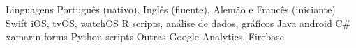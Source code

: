\begin{cvskills}
  \cvskill
    {Linguagens}
    {Português (nativo), Inglês (fluente), Alemão e Francês (iniciante)}
  \cvskill
    {Swift}
    {iOS, tvOS, watchOS}
    \cvskill
    {R}
    {scripts, análise de dados, gráficos}
  \cvskill
    {Java}
    {android}
  \cvskill
    {C\#}
    {xamarin-forms}
  \cvskill
    {Python}
    {scripts}
  \cvskill
    {Outras}
    {Google Analytics, Firebase}
\end{cvskills}
